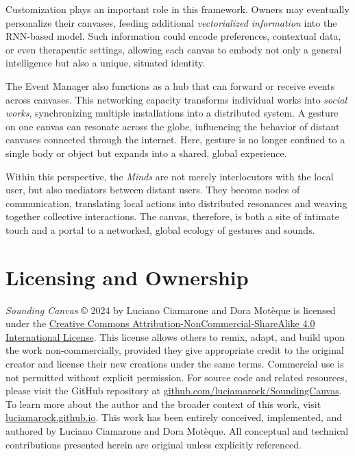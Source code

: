 \documentclass{article}
\begin{document}
Customization plays an important role in this framework. 
Owners may eventually personalize their canvases, feeding additional \textit{vectorialized information} into the RNN-based model. 
Such information could encode preferences, contextual data, or even therapeutic settings, allowing each canvas to embody not only a general intelligence but also a unique, situated identity.

The Event Manager also functions as a hub that can forward or receive events across canvases. 
This networking capacity transforms individual works into \textit{social works}, synchronizing multiple installations into a distributed system. 
A gesture on one canvas can resonate across the globe, influencing the behavior of distant canvases connected through the internet. 
Here, gesture is no longer confined to a single body or object but expands into a shared, global experience.

Within this perspective, the \textit{Minds} are not merely interlocutors with the local user, but also mediators between distant users. 
They become nodes of communication, translating local actions into distributed resonances and weaving together collective interactions. 
The canvas, therefore, is both a site of intimate touch and a portal to a networked, global ecology of gestures and sounds.


\section{Licensing and Ownership}
\textit{Sounding Canvas} © 2024 by Luciano Ciamarone and Dora Motèque is licensed under the \href{https://creativecommons.org/licenses/by-nc-sa/4.0/}{Creative Commons Attribution-NonCommercial-ShareAlike 4.0 International License}.
\newline
This license allows others to remix, adapt, and build upon the work non-commercially, provided they give appropriate credit to the original creator and license their new creations under the same terms. Commercial use is not permitted without explicit permission.
\newline
For source code and related resources, please visit the GitHub repository at \href{https://github.com/luciamarock/SoundingCanvas}{github.com/luciamarock/SoundingCanvas}.  
To learn more about the author and the broader context of this work, visit \href{https://luciamarock.github.io/}{luciamarock.github.io}. \newline 
This work has been entirely conceived, implemented, and authored by Luciano Ciamarone and Dora Motèque. \newline 
All conceptual and technical contributions presented herein are original unless explicitly referenced.
\end{document}
